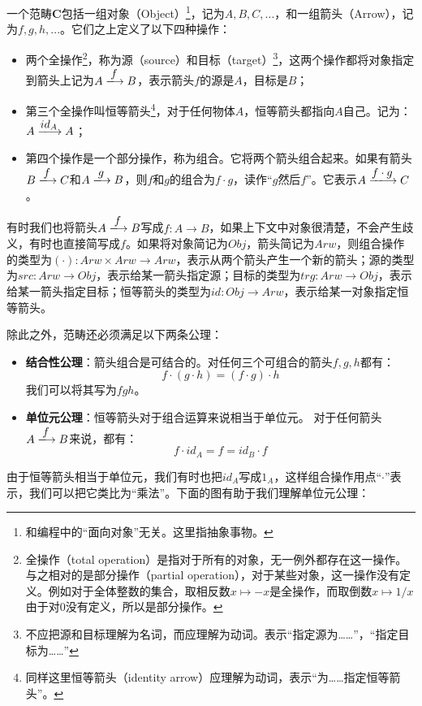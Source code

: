 \documentclass{article}
\begin{document}
\begin{definition}
一个范畴$\pmb{C}$包括一组对象（Object）\footnote{和编程中的“面向对象”无关。这里指抽象事物。}，记为$A, B, C, ...$，和一组箭头（Arrow），记为$f, g, h, ...$。它们之上定义了以下四种操作：
\begin{itemize}
\item 两个全操作\footnote{全操作（total operation）是指对于所有的对象，无一例外都存在这一操作。与之相对的是部分操作（partial operation），对于某些对象，这一操作没有定义。例如对于全体整数的集合，取相反数$x \mapsto -x$是全操作，而取倒数$x \mapsto 1/x$由于对0没有定义，所以是部分操作。}，称为源（source）和目标（target）\footnote{不应把源和目标理解为名词，而应理解为动词。表示“指定源为……”，“指定目标为……”}，这两个操作都将对象指定到箭头上记为$A \arrowto{f} B$，表示箭头$f$的源是$A$，目标是$B$；
\item 第三个全操作叫恒等箭头\footnote{同样这里恒等箭头（identity arrow）应理解为动词，表示“为……指定恒等箭头”。}，对于任何物体$A$，恒等箭头都指向$A$自己。记为：$A \arrowto{id_A} A$；
\item 第四个操作是一个部分操作，称为组合。它将两个箭头组合起来。如果有箭头$B \arrowto{f} C$和$A \arrowto{g} B$，则$f$和$g$的组合为$f \cdot g$，读作“$g$然后$f$”。它表示$A \arrowto{f \cdot g} C$。
\end{itemize}

有时我们也将箭头$A \arrowto{f} B$写成$f: A \to B$，如果上下文中对象很清楚，不会产生歧义，有时也直接简写成$f$。如果将对象简记为$Obj$，箭头简记为$Arw$，则组合操作的类型为$(\cdot) : Arw \times Arw \to Arw$，表示从两个箭头产生一个新的箭头；源的类型为$src: Arw \to Obj$，表示给某一箭头指定源；目标的类型为$trg: Arw \to Obj$，表示给某一箭头指定目标；恒等箭头的类型为$id: Obj \to Arw$，表示给某一对象指定恒等箭头。

除此之外，范畴还必须满足以下两条公理：

\begin{itemize}
\item \textbf{结合性公理}：箭头组合是可结合的。对任何三个可组合的箭头$f, g, h$都有：
\[
f \cdot (g \cdot h) = (f \cdot g) \cdot h
\]
我们可以将其写为$f g h$。
\item \textbf{单位元公理}：恒等箭头对于组合运算来说相当于单位元。
对于任何箭头$A \arrowto{f} B$来说，都有：
\[
f \cdot id_A = f = id_B \cdot f
\]
\end{itemize}
\end{definition}

由于恒等箭头相当于单位元，我们有时也把$id_A$写成$1_A$，这样组合操作用点“$\cdot$”表示，我们可以把它类比为“乘法”。下面的图有助于我们理解单位元公理：
\end{document}
